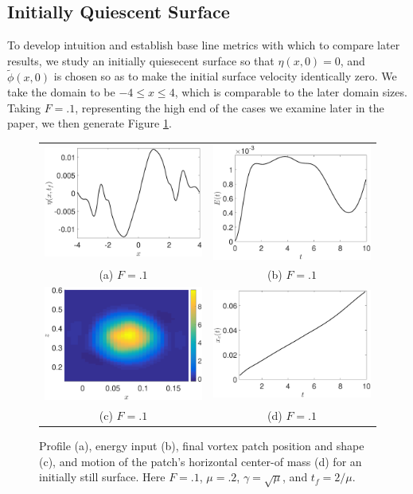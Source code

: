 \documentclass[a4paper,11pt]{article}
\begin{document}
\subsection*{Initially Quiescent Surface}
To develop intuition and establish base line metrics with which to compare later results, we study an initially quiesecent surface so that $\eta(x,0)=0$, and $\tilde{\phi}(x,0)$ is chosen so as to make the initial surface velocity identically zero.  We take the domain to be $-4\leq x \leq 4$, which is comparable to the later domain sizes.  Taking $F=.1$, representing the high end of the cases we examine later in the paper, we then generate Figure \ref{fig:still}.
\begin{figure}
\centering
\begin{tabular}{cc}
\includegraphics[width=.45\textwidth]{profile_mu_0} & \includegraphics[width=.45\textwidth]{energy_mu_0}\\
(a)  $F=.1$ & (b)  $F=.1$\\
\includegraphics[width=.45\textwidth]{vorticity_mu_0} & \includegraphics[width=.45\textwidth]{com_mu_0}\\
(c)  $F=.1$ & (d)  $F=.1$
\end{tabular}
\caption{Profile (a), energy input (b), final vortex patch position and shape (c), and motion of the patch's horizontal center-of mass (d) for an initially still surface.  Here $F=.1$, $\mu=.2$, $\gamma = \sqrt{\mu}$, and $t_{f}=2/\mu$.}
\label{fig:still}
\end{figure}
\end{document}
